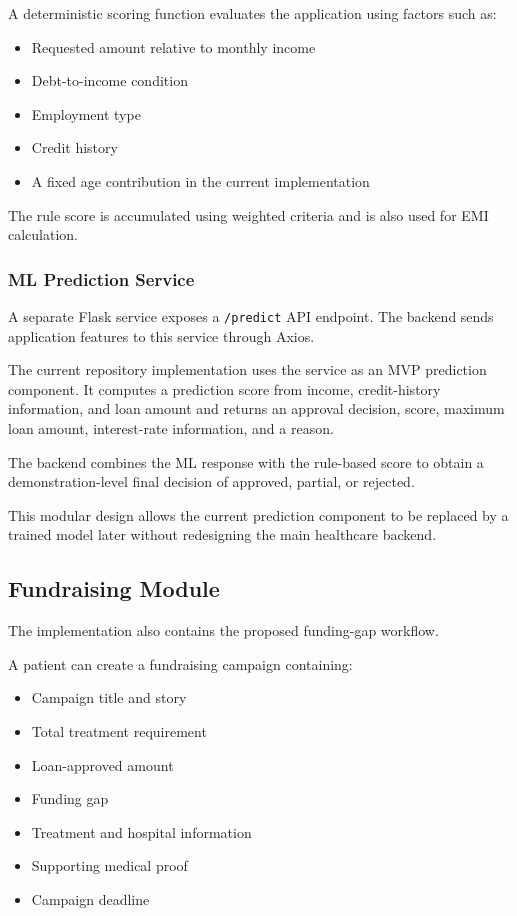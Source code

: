 \documentclass{tietreport}
\begin{document}
A deterministic scoring function evaluates the application using factors
such as:

\begin{itemize}
  \item Requested amount relative to monthly income
  \item Debt-to-income condition
  \item Employment type
  \item Credit history
  \item A fixed age contribution in the current implementation
\end{itemize}

The rule score is accumulated using weighted criteria and is also used
for EMI calculation.

\subsubsection{ML Prediction Service}

A separate Flask service exposes a \texttt{/predict} API endpoint.
The backend sends application features to this service through Axios.

The current repository implementation uses the service as an MVP
prediction component. It computes a prediction score from income,
credit-history information, and loan amount and returns an approval
decision, score, maximum loan amount, interest-rate information, and a
reason.

The backend combines the ML response with the rule-based score to obtain
a demonstration-level final decision of approved, partial, or rejected.

This modular design allows the current prediction component to be
replaced by a trained model later without redesigning the main
healthcare backend.

\subsection{Fundraising Module}

The implementation also contains the proposed funding-gap workflow.

A patient can create a fundraising campaign containing:

\begin{itemize}
  \item Campaign title and story
  \item Total treatment requirement
  \item Loan-approved amount
  \item Funding gap
  \item Treatment and hospital information
  \item Supporting medical proof
  \item Campaign deadline
\end{itemize}
\end{document}
